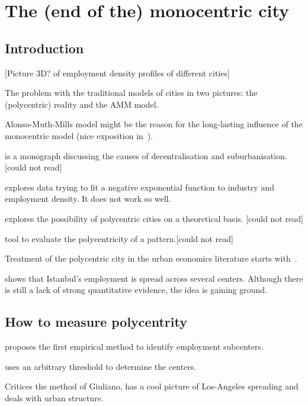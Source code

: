 %
\chapter{The (end of the) monocentric city}
\label{sec:related}


\section{Introduction}
\label{sec:introduction}

[Picture 3D? of employment density profiles of different cities]

The problem with the traditional models of cities in two pictures: the
(polycentric) reality and the AMM model.


Alonso-Muth-Mills model might be the reason for the long-lasting influence of
the monocentric model (nice exposition in~\cite{Fujita:1989}).

\cite{Mills:1972} is a monograph discussing the causes of decentralisation and
suburbanisation. [could not read]

\cite{Kemper:1974} explores data trying to fit a negative exponential function
to industry and employment density. It does not work so well.

\cite{Odland:1978} explores the possibility of polycentric cities on a
theoretical basis. [could not read]

\cite{Griffith:1981} tool to evaluate the polycentricity of a pattern.[could not
read]

Treatment of the polycentric city in the urban economics literature starts
with~\cite{Fujita:1982}.

\cite{Dokmeci:1994} shows that Istanbul's employment is spread across several
centers. Although there is still a lack of strong quantitative evidence, the
idea is gaining ground.



\section{How to measure polycentrity}
\label{sec:how_to_measure_polycentrity}

\cite{McDonald:1987} proposes the first empirical method to identify employment
subcenters.

\cite{Giuliano:1991} uses an arbitrary threshold to determine the centers.

\cite{Anas:1998} Critices the method of Giuliano, has a cool picture of
Los-Angeles spreading and deals with urban structure.

